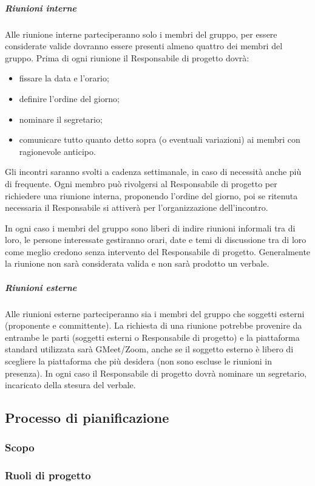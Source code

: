\subparagraph{Riunioni interne}
Alle riunione interne parteciperanno solo i membri del gruppo, per essere considerate valide dovranno essere presenti almeno quattro dei membri del gruppo. Prima di ogni riunione il Responsabile di progetto dovrà:
\begin{itemize}
\item fissare la data e l'orario;
\item definire l'ordine del giorno;
\item nominare il segretario;
\item comunicare tutto quanto detto sopra (o eventuali variazioni) ai membri con ragionevole anticipo.
\end{itemize}

Gli incontri saranno svolti a cadenza settimanale, in caso di necessità anche più di frequente.
Ogni membro può rivolgersi al Responsabile di progetto per richiedere una riunione interna, proponendo l'ordine del giorno, poi se ritenuta necessaria il Responsabile si attiverà per l'organizzazione dell'incontro.

In ogni caso i membri del gruppo sono liberi di indire riunioni informali tra di loro, le persone interessate gestiranno orari, date e temi di discussione tra di loro come meglio credono senza intervento del Responsabile di progetto.
Generalmente la riunione non sarà considerata valida e non sarà prodotto un verbale.

\subparagraph{Riunioni esterne}
Alle riunioni esterne parteciperanno sia i membri del gruppo che soggetti esterni (proponente e committente). La richiesta di una riunione potrebbe provenire da entrambe le parti (soggetti esterni o Responsabile di progetto) e la piattaforma standard utilizzata sarà GMeet/Zoom, anche se il soggetto esterno è libero di scegliere la piattaforma che più desidera (non sono escluse le riunioni in presenza). In ogni caso il Responsabile di progetto dovrà nominare un segretario, incaricato della stesura del verbale.

\subsection{Processo di pianificazione}
\subsubsection{Scopo}
\subsubsection{Ruoli di progetto}
